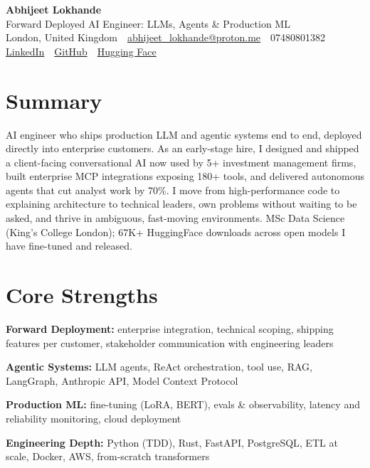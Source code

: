 \documentclass[10pt,a4paper]{article}
\newcommand{\sep}{\,\textcolor{accent!60}{\textbar}\,}
\begin{document}
\begin{center}
  {\fontsize{24}{26}\selectfont\bfseries Abhijeet Lokhande}\\[3pt]
  {\color{accent}\large Forward Deployed AI Engineer: LLMs, Agents \& Production ML}\\[5pt]
  {\small
    London, United Kingdom \sep
    \href{mailto:abhijeet_lokhande@proton.me}{abhijeet\_lokhande@proton.me} \sep
    07480801382 \\[2pt]
    \href{https://www.linkedin.com/in/ablds/}{LinkedIn} \sep
    \href{https://github.com/abhijeetscode}{GitHub} \sep
    \href{https://huggingface.co/ab-ai}{Hugging Face}
  }
\end{center}
\vspace{2pt}

\section{Summary}
AI engineer who ships production LLM and agentic systems end to end, deployed directly into enterprise customers. As an early-stage hire, I designed and shipped a client-facing conversational AI now used by 5+ investment management firms, built enterprise MCP integrations exposing 180+ tools, and delivered autonomous agents that cut analyst work by 70\%. I move from high-performance code to explaining architecture to technical leaders, own problems without waiting to be asked, and thrive in ambiguous, fast-moving environments. MSc Data Science (King's College London); 67K+ HuggingFace downloads across open models I have fine-tuned and released.

\section{Core Strengths}
\begin{tight}
  \item[\textcolor{accent}{\small$\bullet$}] \textbf{Forward Deployment:} enterprise integration, technical scoping, shipping features per customer, stakeholder communication with engineering leaders
  \item[\textcolor{accent}{\small$\bullet$}] \textbf{Agentic Systems:} LLM agents, ReAct orchestration, tool use, RAG, LangGraph, Anthropic API, Model Context Protocol
  \item[\textcolor{accent}{\small$\bullet$}] \textbf{Production ML:} fine-tuning (LoRA, BERT), evals \& observability, latency and reliability monitoring, cloud deployment
  \item[\textcolor{accent}{\small$\bullet$}] \textbf{Engineering Depth:} Python (TDD), Rust, FastAPI, PostgreSQL, ETL at scale, Docker, AWS, from-scratch transformers
\end{tight}
\end{document}
